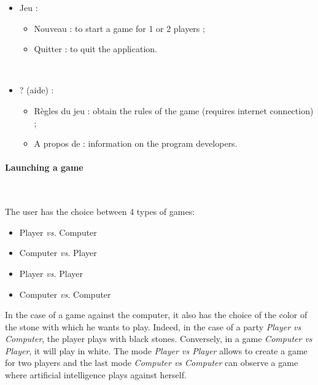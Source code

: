 \documentclass[a4paper,10pt,twoside]{report}
\begin{document}
        \begin{itemize}
        
        \item{Jeu : 
                \begin{itemize} 
                \item{Nouveau : to start a game for 1 or 2 players ;}
                \item{Quitter : to quit the application.} 
                \end{itemize}}


        ~~\vspace{1mm}
        \item{? (aide) :
                \begin{itemize} 
                \item{Règles du jeu : obtain the rules of the game (requires internet connection) ;}
                \item{A propos de : information on the program developers.} 
                \end{itemize}}
        
        \end{itemize}

	\paragraph{Launching a game}
        ~~\vspace{2mm}

        The user has the choice between 4 types of games:
        \vspace{3mm}

        \begin{itemize}
        
        \item{Player \emph{vs.} Computer}

        \item{Computer \emph{vs.} Player}

        \item{Player \emph{vs.} Player}

        \item{Computer \emph{vs.} Computer}
        
        \end{itemize}

        \vspace{3mm}
        In the case of a game against the computer, it also has the choice of the color of the stone with which he wants to play. Indeed, in the case of a party \emph{Player vs Computer}, the player plays with black stones. Conversely, in a game \emph{Computer vs Player}, it will play in white. The mode \emph{Player vs Player} allows to create a game for two players and the last mode \emph{Computer vs Computer} can observe a game where artificial intelligence plays against herself.
\end{document}
